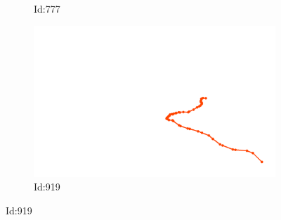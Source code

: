 \documentclass[12pt,twoside]{report}
\begin{document}
\begin{figure}
\begin{subfigure}[b]{0.20\textwidth}
\caption{Id:777}
\end{subfigure}
\begin{subfigure}[b]{0.20\textwidth}
\centering
\includegraphics[width=\textwidth]{../../trajectories/919.png}
\caption{Id:919}
\end{subfigure}
\end{figure}
\end{document}
